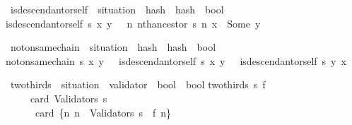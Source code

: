 \documentclass{beamer}
\begin{document}
\begin{frame}
\isamarkupfalse%
\ is{\isacharunderscore}descendant{\isacharunderscore}or{\isacharunderscore}self\ {\isacharcolon}{\isacharcolon}\ {\isachardoublequoteopen}situation\ {\isasymRightarrow}\ hash\ {\isasymRightarrow}\ hash\ {\isasymRightarrow}\ bool{\isachardoublequoteclose}\isanewline
{}\isanewline
           {\isachardoublequoteopen}is{\isacharunderscore}descendant{\isacharunderscore}or{\isacharunderscore}self\ s\ x\ y\ {\isacharequal}\ {\isacharparenleft}{\isasymexists}\ n{\isachardot}\ nth{\isacharunderscore}ancestor\ s\ n\ x\ {\isacharequal}\ Some\ y{\isacharparenright}{\isachardoublequoteclose}%

           \vfill
{}\isamarkupfalse%
\ not{\isacharunderscore}on{\isacharunderscore}same{\isacharunderscore}chain\ {\isacharcolon}{\isacharcolon}\ {\isachardoublequoteopen}situation\ {\isasymRightarrow}\ hash\ {\isasymRightarrow}\ hash\ {\isasymRightarrow}\ bool{\isachardoublequoteclose}\isanewline
{}\isanewline
{\isachardoublequoteopen}not{\isacharunderscore}on{\isacharunderscore}same{\isacharunderscore}chain\ s\ x\ y\ {\isacharequal}\ {\isacharparenleft}{\isacharparenleft}{\isasymnot}\ is{\isacharunderscore}descendant{\isacharunderscore}or{\isacharunderscore}self\ s\ x\ y{\isacharparenright}\ {\isasymand}\ {\isacharparenleft}{\isasymnot}\ is{\isacharunderscore}descendant{\isacharunderscore}or{\isacharunderscore}self\ s\ y\ x{\isacharparenright}{\isacharparenright}{\isachardoublequoteclose}%
\end{frame}

\renewcommand{\isacharbraceleft}{\{}
\renewcommand{\isacharbraceright}{\}}

\begin{frame}
\isamarkupfalse%
\ two{\isacharunderscore}thirds\ {\isacharcolon}{\isacharcolon}\ {\isachardoublequoteopen}situation\ {\isasymRightarrow}\ {\isacharparenleft}validator\ {\isasymRightarrow}\ bool{\isacharparenright}\ {\isasymRightarrow}\ bool{\isachardoublequoteclose}\isanewline
{}\isanewline
{\isachardoublequoteopen}two{\isacharunderscore}thirds\ s\ f\ {\isacharequal}\isanewline
\ \ \ {\isacharparenleft}{}\ {\isacharasterisk}\ card\ {\isacharparenleft}Validators\ s{\isacharparenright}\ {\isasymle}\\\ \ \ \  {}\ {\isacharasterisk}\ card\ {\isacharparenleft}{\isacharbraceleft}n{\isachardot}\ n\ {\isasymin}\ Validators\ s\ {\isasymand}\ f\ n{\isacharbraceright}{\isacharparenright}{\isacharparenright}{\isachardoublequoteclose}%
\end{frame}
\end{document}
